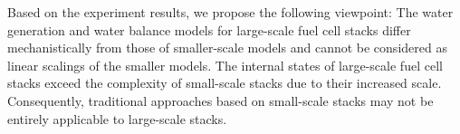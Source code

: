 \par
Based on the experiment results, we propose the following viewpoint: The water generation and water balance models for large-scale fuel cell stacks differ mechanistically from those of smaller-scale models and cannot be considered as linear scalings of the smaller models. The internal states of large-scale fuel cell stacks exceed the complexity of small-scale stacks due to their increased scale. Consequently, traditional approaches based on small-scale stacks may not be entirely applicable to large-scale stacks.
